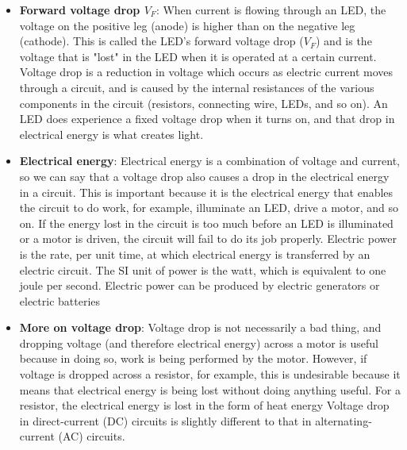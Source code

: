 \documentclass{report}
\begin{document}
\begin{itemize}
            big size (in terms of its resistance value) it may well start to get warm because it is having to dissipate a lot of electrical energy as heat in order to bring the current down to a level that is suitable for the LED. If this happens, try using a slightly smaller resistor. Don't go too small though, otherwise you'll run the risk that the resistor doesn't provide enough protection for the LED.
        \item \textbf{Forward voltage drop $V_{F}$}: When current is flowing through an LED, the voltage on the positive leg (anode) is higher than on the negative leg (cathode). This is called the LED's forward voltage drop ($V_{F}$) and is the voltage that is "lost" in the LED when it is operated at a certain current.
            \bigbreak \noindent 
            Voltage drop is a reduction in voltage which occurs as electric current moves through a circuit, and is caused by the internal resistances of the various components in the circuit (resistors, connecting wire, LEDs, and so on).
            \bigbreak \noindent 
            An LED does experience a fixed voltage drop when it turns on, and that drop in electrical energy is what creates light.
        \item \textbf{Electrical energy}: Electrical energy is a combination of voltage and current, so we can say that a voltage drop also causes a drop in the electrical energy in a circuit. This is important because it is the electrical energy that enables the circuit to do work, for example, illuminate an LED, drive a motor, and so on. If the energy lost in the circuit is too much before an LED is illuminated or a motor is driven, the circuit will fail to do its job properly.
            \bigbreak \noindent 
            Electric power is the rate, per unit time, at which electrical energy is transferred by an electric circuit. The SI unit of power is the watt, which is equivalent to one joule per second. Electric power can be produced by electric generators or electric batteries
        \item \textbf{More on voltage drop}: Voltage drop is not necessarily a bad thing, and dropping voltage (and therefore electrical energy) across a motor is useful because in doing so, work is being performed by the motor. However, if voltage is dropped across a resistor, for example, this is undesirable because it means that electrical energy is being lost without doing anything useful. For a resistor, the electrical energy is lost in the form of heat energy
            \bigbreak \noindent 
            Voltage drop in direct-current (DC) circuits is slightly different to that in alternating-current (AC) circuits.

\end{itemize}
\end{document}
